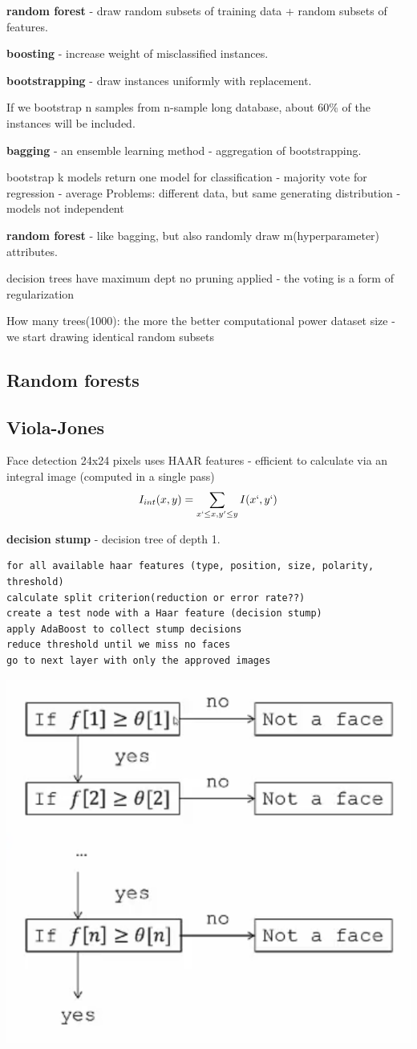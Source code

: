 \documentclass{article}
\newcommand{\para}[0]{\par\vspace{0.2cm}\noindent}
\newcommand{\define}[2]{\textbf{#1} - {#2}.  \para}
\begin{document}
\define{random forest}
           {draw random subsets of training data + random subsets of features}

\define{boosting}
           {increase weight of misclassified instances}

\define{bootstrapping}
           {draw instances uniformly with replacement}

If we bootstrap n samples from n-sample long database, about 60\% of the instances will be included.

\define{bagging}
           {an ensemble learning method - aggregation of bootstrapping}
bootstrap k models
return one model
    for classification - majority vote
    for regression - average
Problems: different data, but same generating distribution - models not independent
  
\define{random forest}
           {like bagging, but also randomly draw m(hyperparameter) attributes}  
decision trees have maximum dept
no pruning applied - the voting is a form of regularization

How many trees(1000):
    the more the better
    computational power
    dataset size - we start drawing identical random subsets

\subsection{Random forests}

\subsection{Viola-Jones}
Face detection
24x24 pixels
uses HAAR features - 
    efficient to calculate via an integral image (computed in a single pass)
$$ I_{int}(x, y) = \sum_{x` \leq x, y' \leq y} I(x`, y`) $$

\define{decision stump}
           {decision tree of depth 1}

\begin{verbatim}
for all available haar features (type, position, size, polarity, threshold)
calculate split criterion(reduction or error rate??)
create a test node with a Haar feature (decision stump)
apply AdaBoost to collect stump decisions
reduce threshold until we miss no faces
go to next layer with only the approved images

\end{verbatim}

\includegraphics[height=0.5\textwidth]{haar}
\end{document}
